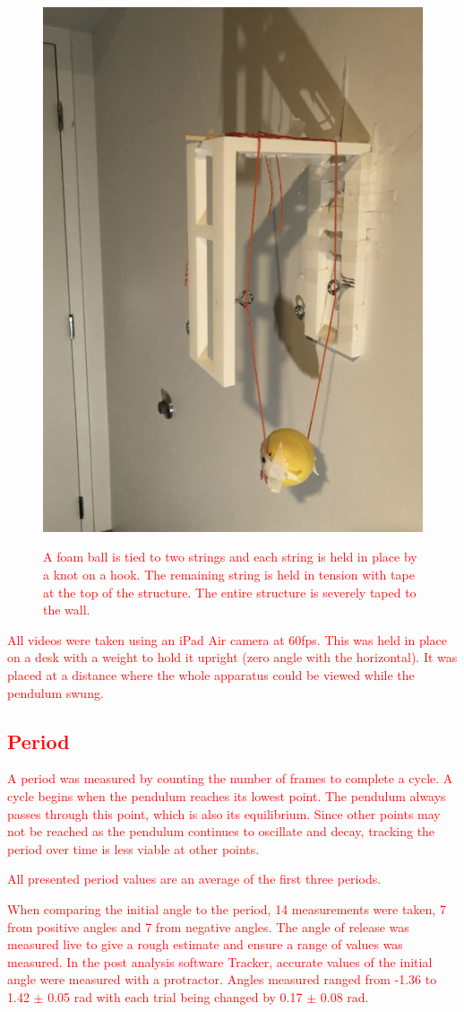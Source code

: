 \documentclass[12pt,twocolumn]{article}
\begin{document}
\begin{figure}[!h]
\begin{centering}
\includegraphics[width=0.4 \textwidth]{images/setup.png}
\label{fig:FallingRock}
\caption{\textcolor{red}{A foam ball is tied to two strings
and each string is held in place by a knot on a
hook. The remaining string is held in tension
with tape at the top of the structure. The
entire structure is severely taped to the wall.}}
\end{centering}
\end{figure}

\textcolor{red}{All videos were taken using an iPad Air camera at 60fps. This was held in place on a
desk with a weight to hold it upright (zero
angle with the horizontal). It was placed at
a distance where the whole apparatus could
be viewed while the pendulum swung.}

\subsection{\textcolor{red}{Period}}

\textcolor{red}{A period was measured by counting the number of frames to complete a cycle. A cycle
begins when the pendulum reaches its lowest
point. The pendulum always passes through
this point, which is also its equilibrium. Since
other points may not be reached as the pendulum continues to oscillate and decay, tracking the period over time is less viable at other
points.}

\textcolor{red}{All presented period values are an average of the
first three periods.}

\textcolor{red}{When comparing the initial angle to the period, 14 measurements were taken, 7 from
positive angles and 7 from negative angles.
The angle of release was measured live to
give a rough estimate and ensure a range
of values was measured. In the post analysis software Tracker, accurate values of the
initial angle were measured with a protractor. Angles measured ranged from -1.36 to
1.42 $\pm$ 0.05 rad with each trial being changed
by 0.17 $\pm$ 0.08 rad.}
\end{document}
